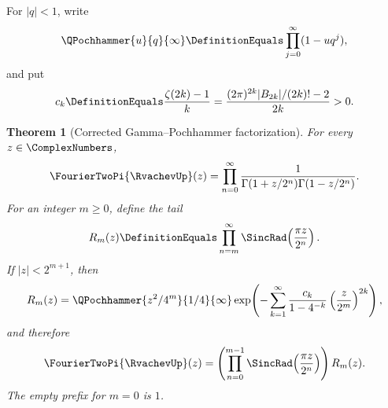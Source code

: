 \documentclass[11pt,oneside]{article}
\numberwithin{equation}{section}
\newtheorem{theorem}{Theorem}[section]
\theoremstyle{definition}
\theoremstyle{remark}
\begin{document}
For $|q|<1$, write
\[
 \QPochhammer{u}{q}{\infty}\DefinitionEquals
 \prod_{j=0}^{\infty}(1-uq^j),
\]
and put
\begin{equation}
 c_k\DefinitionEquals\frac{\zeta(2k)-1}{k}
 =\frac{(2\pi)^{2k}|B_{2k}|/(2k)!-2}{2k}>0.
 \label{eq:ck}
\end{equation}

\begin{theorem}[Corrected Gamma--Pochhammer factorization]
\label{thm:pochhammer-tail}
For every $z\in\ComplexNumbers$,
\begin{equation}
 \FourierTwoPi{\RvachevUp}(z)=\prod_{n=0}^{\infty}
 \frac{1}{\Gamma(1+z/2^n)\Gamma(1-z/2^n)}.
 \label{eq:reciprocal-gamma-product}
\end{equation}
For an integer $m\ge0$, define the tail
\[
 R_m(z)\DefinitionEquals\prod_{n=m}^{\infty}\SincRad\!\left(\frac{\pi z}{2^n}\right).
\]
If $|z|<2^{m+1}$, then
\begin{equation}
 R_m(z)
 =\QPochhammer{z^2/4^m}{1/4}{\infty}
 \exp\!\left(
   -\sum_{k=1}^{\infty}
    \frac{c_k}{1-4^{-k}}\left(\frac{z}{2^m}\right)^{2k}
 \right),
 \label{eq:corrected-pochhammer-tail}
\end{equation}
and therefore
\begin{equation}
 \FourierTwoPi{\RvachevUp}(z)=
 \left(\prod_{n=0}^{m-1}\SincRad\!\left(\frac{\pi z}{2^n}\right)\right)
 R_m(z).
 \label{eq:finite-prefix-tail}
\end{equation}
The empty prefix for $m=0$ is $1$.
\end{theorem}
\end{document}
